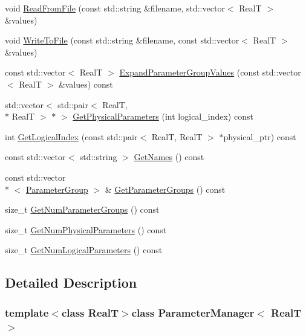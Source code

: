 \begin{DoxyCompactItemize}
\item 
void \hyperlink{class_parameter_manager_a252dfb04145a875f2ea6d0a66c021a97}{Read\+From\+File} (const std\+::string \&filename, std\+::vector$<$ Real\+T $>$ \&values)
\item 
void \hyperlink{class_parameter_manager_a836ef691153cf1c440da8cd3933395ad}{Write\+To\+File} (const std\+::string \&filename, const std\+::vector$<$ Real\+T $>$ \&values)
\item 
const std\+::vector$<$ Real\+T $>$ \hyperlink{class_parameter_manager_a47ddfcb769e8f6074b13cfa01fc03792}{Expand\+Parameter\+Group\+Values} (const std\+::vector$<$ Real\+T $>$ \&values) const 
\item 
std\+::vector$<$ std\+::pair$<$ Real\+T, \\*
Real\+T $>$ $\ast$ $>$ \hyperlink{class_parameter_manager_a7ff5d5a2b81a77db94c8d879a8cc620a}{Get\+Physical\+Parameters} (int logical\+\_\+index) const 
\item 
int \hyperlink{class_parameter_manager_a46dea3ed20a97d19ff4ddecf1b37d6cd}{Get\+Logical\+Index} (const std\+::pair$<$ Real\+T, Real\+T $>$ $\ast$physical\+\_\+ptr) const 
\item 
const std\+::vector$<$ std\+::string $>$ \hyperlink{class_parameter_manager_a3e53de0b8ec824feef3a6deabf4f419c}{Get\+Names} () const 
\item 
const std\+::vector\\*
$<$ \hyperlink{struct_parameter_group}{Parameter\+Group} $>$ \& \hyperlink{class_parameter_manager_a98e565008f243aa0bab93b801d206339}{Get\+Parameter\+Groups} () const 
\item 
size\+\_\+t \hyperlink{class_parameter_manager_af56ee5380a33948cc6909c874857cb21}{Get\+Num\+Parameter\+Groups} () const 
\item 
size\+\_\+t \hyperlink{class_parameter_manager_a5b12f8857c1c82fa4f8217fb8538d934}{Get\+Num\+Physical\+Parameters} () const 
\item 
size\+\_\+t \hyperlink{class_parameter_manager_ac9b5bef0d35ab50bc34c4eddb6d94c8c}{Get\+Num\+Logical\+Parameters} () const 
\end{DoxyCompactItemize}


\subsection{Detailed Description}
\subsubsection*{template$<$class Real\+T$>$class Parameter\+Manager$<$ Real\+T $>$}



